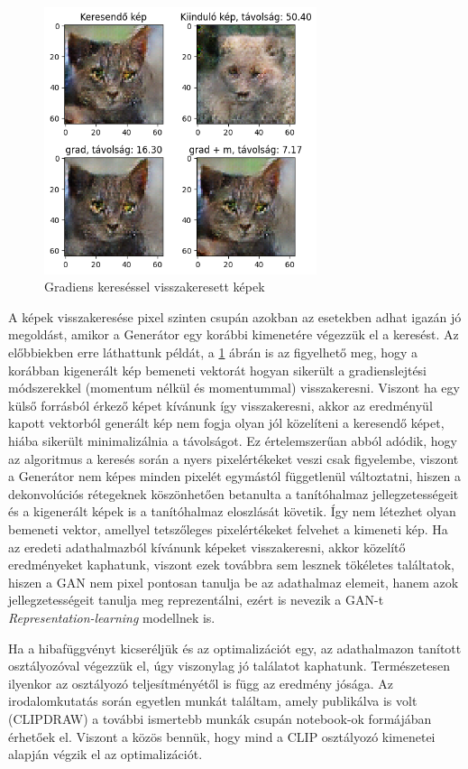 \begin{figure}[h]
\centering
\includegraphics[width=8cm]{images/grad_found.png}
\caption{Gradiens kereséssel visszakeresett képek}
\label{fig:gradfound}
\end{figure}

A képek visszakeresése pixel szinten csupán azokban az esetekben adhat igazán jó megoldást, amikor a Generátor egy korábbi kimenetére végezzük el a keresést. Az előbbiekben erre láthattunk példát, a \ref{fig:gradfound} ábrán is az figyelhető meg, hogy a korábban kigenerált kép bemeneti vektorát hogyan sikerült a gradienslejtési módszerekkel (momentum nélkül és momentummal) visszakeresni.
Viszont ha egy külső forrásból érkező képet kívánunk így visszakeresni, akkor az eredményül kapott vektorból generált kép nem fogja olyan jól közelíteni a keresendő képet, hiába sikerült minimalizálnia a távolságot.
Ez értelemszerűan abból adódik, hogy az algoritmus a keresés során a nyers pixelértékeket veszi csak figyelembe, viszont a Generátor nem képes minden pixelét egymástól függetlenül változtatni, hiszen a dekonvolúciós rétegeknek köszönhetően betanulta a tanítóhalmaz jellegzetességeit és a kigenerált képek is a tanítóhalmaz eloszlását követik. Így nem létezhet olyan bemeneti vektor, amellyel tetszőleges pixelértékeket felvehet a kimeneti kép.
Ha az eredeti adathalmazból  kívánunk képeket visszakeresni, akkor közelítő eredményeket kaphatunk, viszont ezek továbbra sem lesznek tökéletes találtatok, hiszen a GAN nem pixel pontosan tanulja be az adathalmaz elemeit, hanem azok jellegzetességeit tanulja meg reprezentálni, ezért is nevezik a GAN-t \textit{Representation-learning} \cite{geron2019hands} modellnek is.

Ha a hibafüggvényt kicseréljük és az optimalizációt egy, az adathalmazon tanított osztályozóval végezzük el, úgy viszonylag jó találatot kaphatunk. Természetesen ilyenkor az osztályozó teljesítményétől is függ az eredmény jósága.
Az irodalomkutatás során egyetlen munkát találtam, amely publikálva is volt (CLIPDRAW\cite{frans2021clipdraw}) a további ismertebb munkák csupán notebook-ok formájában érhetőek el. Viszont a közös bennük, hogy mind a CLIP\cite{radford2021learning} osztályozó kimenetei alapján végzik el az optimalizációt.

